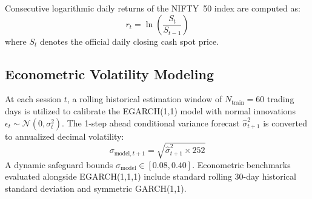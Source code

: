 \documentclass[journal]{IEEEtran}
\begin{document}
Consecutive logarithmic daily returns of the NIFTY~50 index are computed as:
\begin{equation}
r_t = \ln\left(\frac{S_t}{S_{t-1}}\right)
\end{equation}
where $S_t$ denotes the official daily closing cash spot price.

\subsection{Econometric Volatility Modeling}
At each session $t$, a rolling historical estimation window of $N_{\mathrm{train}}=60$ trading days is utilized to calibrate the EGARCH(1,1) model with normal innovations $\epsilon_t \sim \mathcal{N}(0, \sigma_t^2)$. The 1-step ahead conditional variance forecast $\hat{\sigma}_{t+1}^2$ is converted to annualized decimal volatility:
\begin{equation}
\sigma_{\mathrm{model},t+1} = \sqrt{\hat{\sigma}_{t+1}^2 \times 252}
\end{equation}
A dynamic safeguard bounds $\sigma_{\mathrm{model}} \in [0.08, 0.40]$. Econometric benchmarks evaluated alongside EGARCH(1,1,1) include standard rolling 30-day historical standard deviation and symmetric GARCH(1,1).
\end{document}
